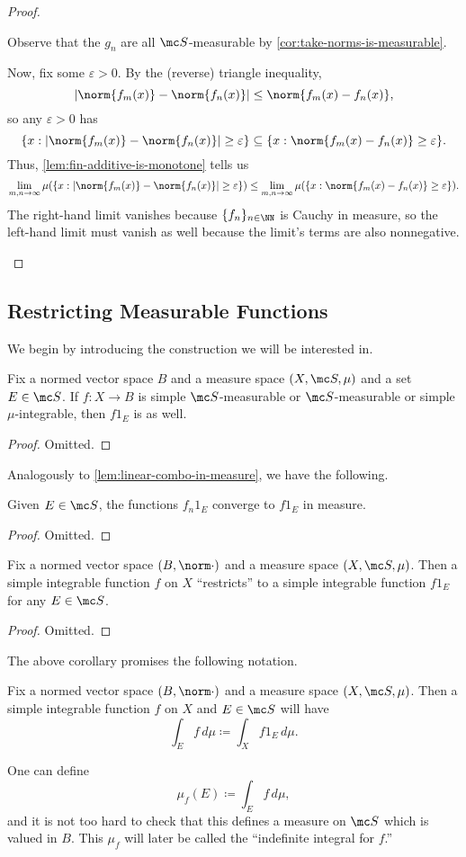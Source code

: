 \documentclass[../notes.tex]{subfiles}
\begin{document}
\begin{proof}
\begin{listalph}
		\item Observe that the $g_n$ are all $\mc S$-measurable by \autoref{cor:take-norms-is-measurable}.

		Now, fix some $\varepsilon>0$. By the (reverse) triangle inequality,
		\[|\norm{f_m(x)}-\norm{f_n(x)}|\le\norm{f_m(x)-f_n(x)},\]
		so any $\varepsilon>0$ has
		\[\{x:|\norm{f_m(x)}-\norm{f_n(x)}|\ge\varepsilon\}\subseteq\{x:\norm{f_m(x)-f_n(x)}\ge\varepsilon\}.\]
		Thus, \autoref{lem:fin-additive-is-monotone} tells us
		\[\lim_{m,n\to\infty}\mu(\{x:|\norm{f_m(x)}-\norm{f_n(x)}|\ge\varepsilon\})\le\lim_{m,n\to\infty}\mu(\{x:\norm{f_m(x)-f_n(x)}\ge\varepsilon\}).\]
		The right-hand limit vanishes because $\{f_n\}_{n\in\NN}$ is Cauchy in measure, so the left-hand limit must vanish as well because the limit's terms are also nonnegative.
		\qedhere
	\end{listalph}
\end{proof}

\subsection{Restricting Measurable Functions}
We begin by introducing the construction we will be interested in.
\begin{lemma}
	Fix a normed vector space $B$ and a measure space $(X,\mc S,\mu)$ and a set $E\in\mc S$. If $f\colon X\to B$ is simple $\mc S$-measurable or $\mc S$-measurable or simple $\mu$-integrable, then $f1_E$ is as well.
\end{lemma}
\begin{proof}
	Omitted.
\end{proof}
Analogously to \autoref{lem:linear-combo-in-measure}, we have the following.
\begin{lemma}
	Given $E\in\mc S$, the functions $f_n1_E$ converge to $f1_E$ in measure.
\end{lemma}
\begin{proof}
	Omitted.
\end{proof}
\begin{corollary}
	Fix a normed vector space $(B,\norm\cdot)$ and a measure space $(X,\mc S,\mu)$. Then a simple integrable function $f$ on $X$ ``restricts'' to a simple integrable function $f1_E$ for any $E\in\mc S$.
\end{corollary}
\begin{proof}
	Omitted.
\end{proof}
The above corollary promises the following notation.
\begin{notation}
	Fix a normed vector space $(B,\norm\cdot)$ and a measure space $(X,\mc S,\mu)$. Then a simple integrable function $f$ on $X$ and $E\in\mc S$ will have
	\[\int_Ef\,d\mu\coloneqq\int_Xf1_E\,d\mu.\]
\end{notation}
\begin{remark}
	One can define
	\[\mu_f(E)\coloneqq\int_Ef\,d\mu,\]
	and it is not too hard to check that this defines a measure on $\mc S$ which is valued in $B$. This $\mu_f$ will later be called the ``indefinite integral for $f$.''
\end{remark}
\end{document}
